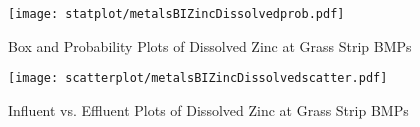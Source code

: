         \begin{figure}[hb]   %
            \centering
            \texttt{[image: statplot/metalsBIZincDissolvedprob.pdf]}
            \caption{Box and Probability Plots of Dissolved Zinc at Grass Strip BMPs}
        \end{figure}         %
        
        
        \begin{figure}[hb]   %
            \centering
            \texttt{[image: scatterplot/metalsBIZincDissolvedscatter.pdf]}
            \caption{Influent vs. Effluent Plots of Dissolved Zinc at Grass Strip BMPs}
        \end{figure}         %
        \clearpage
        